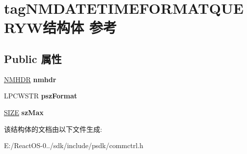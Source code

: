 \hypertarget{structtag_n_m_d_a_t_e_t_i_m_e_f_o_r_m_a_t_q_u_e_r_y_w}{}\section{tag\+N\+M\+D\+A\+T\+E\+T\+I\+M\+E\+F\+O\+R\+M\+A\+T\+Q\+U\+E\+R\+Y\+W结构体 参考}
\label{structtag_n_m_d_a_t_e_t_i_m_e_f_o_r_m_a_t_q_u_e_r_y_w}
\subsection*{Public 属性}
\begin{DoxyCompactItemize}
\item 
\mbox{\label{structtag_n_m_d_a_t_e_t_i_m_e_f_o_r_m_a_t_q_u_e_r_y_w_abb4fb88efe5decf83af308de5fabfccb}} 
\hyperlink{structtag_n_m_h_d_r}{N\+M\+H\+DR} {\bfseries nmhdr}
\item 
\mbox{\label{structtag_n_m_d_a_t_e_t_i_m_e_f_o_r_m_a_t_q_u_e_r_y_w_aeb5df0635b92283bc01d384402c2de74}} 
L\+P\+C\+W\+S\+TR {\bfseries psz\+Format}
\item 
\mbox{\label{structtag_n_m_d_a_t_e_t_i_m_e_f_o_r_m_a_t_q_u_e_r_y_w_a6bf7aa4ed9e47abbb28faf5040c5f386}} 
\hyperlink{structtag_s_i_z_e}{S\+I\+ZE} {\bfseries sz\+Max}
\end{DoxyCompactItemize}


该结构体的文档由以下文件生成\+:\begin{DoxyCompactItemize}
\item 
E\+:/\+React\+O\+S-\/0../sdk/include/psdk/commctrl.\+h\end{DoxyCompactItemize}
